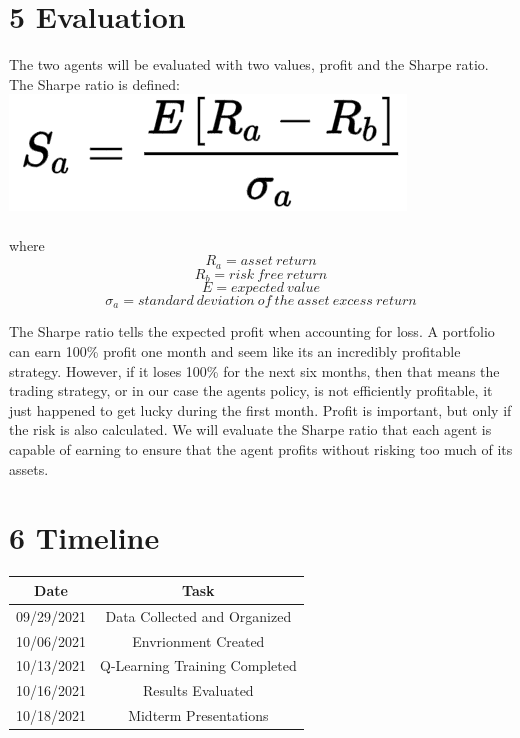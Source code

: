 \documentclass[letterpaper]{article}
\begin{document}
\section{5 Evaluation}
The two agents will be evaluated with two values, profit and the Sharpe ratio. The Sharpe ratio is defined:
\includegraphics{Sharpe} 
\\
\\
where
\[ R_a = asset\ return \] 
\[ R_b = risk\ free\ return \] 
\[ E = expected\  value \] 
\[ \sigma_a = standard\ deviation\ of\ the\ asset\ excess\ return \] 

The Sharpe ratio tells the expected profit when accounting for loss. A portfolio can earn 100\% profit one month and seem like its an incredibly profitable strategy. However, if it loses 100\% for the next six months, then that means the trading strategy, or in our case the agents policy, is not efficiently profitable, it just happened to get lucky during the first month. Profit is important, but only if the risk is also calculated. We will evaluate the Sharpe ratio that each agent is capable of earning to ensure that the agent profits without risking too much of its assets.
	
\section{6 Timeline}
\begin{center}
\begin{tabular}{||c|c|||} 
 \hline
 Date & Task \\ [0.5ex] 
 \hline\hline
 09/29/2021 & Data Collected and Organized \\ 
 \hline
 10/06/2021 & Envrionment Created \\
 \hline
 10/13/2021 & Q-Learning Training Completed \\
 \hline
 10/16/2021 & Results Evaluated \\
 \hline
 10/18/2021 & Midterm Presentations \\ [1ex] 
 \hline
\end{tabular}
\end{center}
\end{document}
